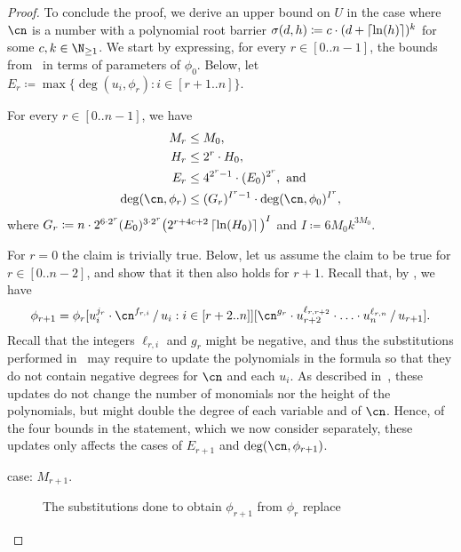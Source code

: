 \begin{proof}
  To conclude the proof, we derive an upper bound on $U$ in the case where $\cn$
  is a number with a polynomial root barrier $\sigma(d,h) \coloneqq c \cdot (d +
  \left\lceil\ln(h)\right\rceil)^k$ for some $c,k \in \N_{\geq 1}$. We start by expressing, for
  every $r \in [0..n-1]$, the bounds from~ in terms of
  parameters of $\phi_0$. Below, let $E_r \coloneqq \max\{\deg(u_i,\phi_r) : i
  \in [r+1..n]\}$.
  \begin{claim}\label{claim:ugly-bounds}
    For every $r \in [0..n-1]$, we have
    \begin{align*}
      M_r &\leq M_0,\\ 
      H_r &\leq 2^r \cdot H_0,\\
      E_r &\leq 4^{2^r-1} \cdot (E_0)^{2^r}, \text{ and }\\
      \deg(\cn,\phi_r) &\leq (G_r)^{I^r-1} \cdot \deg(\cn,\phi_0)^{I^r},
    \end{align*}
    where $G_r \coloneqq n \cdot 2^{6 \cdot 2^r}(E_0)^{3 \cdot 2^r} \big(2^{r+4c+2} \left\lceil\ln(H_0)\right\rceil\big)^{I}$ and $I \coloneqq 6M_0k^{3M_0}$.
  \end{claim}
  \begin{claimproof}
    For $r = 0$ the claim is trivially true. Below, let us assume the claim to
    be true for $r \in [0..n-2]$, and show that it then also holds for $r+1$.
    Recall that, by , we have 
    \begin{equation}
      \label{eq:phirp1phir}
      \phi_{r+1} = \phi_r\sub{u_i^{j_r} \cdot
      \cn^{f_{r,i}}}{u_i : i \in [r+2..n]}\sub{\cn^{g_r} \cdot
      u_{r+2}^{\ell_{r,r+2}} \cdot \ldots \cdot
      u_{n}^{\ell_{r,n}}}{u_{r+1}}.
    \end{equation}
    Recall that the integers $\ell_{r,i}$ and $g_r$ might be negative, and thus
    the substitutions performed in~ may require to update
    the polynomials in the formula so that they do not contain negative degrees
    for $\cn$ and each $u_i$. As described
    in~, these updates do not change the
    number of monomials nor the height of the polynomials, but might double the
    degree of each variable and of $\cn$. Hence, of the four bounds in the
    statement, which we now consider separately, these updates only affects the
    cases of $E_{r+1}$ and $\deg(\cn,\phi_{r+1})$.
    \begin{description}
      \item[case: $M_{r+1}$.] 
        The substitutions done to obtain $\phi_{r+1}$ from $\phi_r$ replace

\end{description}
\end{claimproof}
\end{proof}
